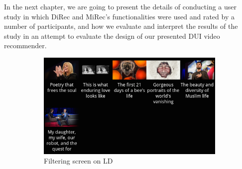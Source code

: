  
In the next chapter, we are going to present the details of conducting a user
study in which DiRec and MiRec's functionalities were used and rated by a number
of participants, and how we evaluate and interpret the results of the study in
an attempt to evaluate the design of our presented DUI video recommender.
\begin{figure}[!htpb]
    \centering
    \begin{subfigure}[b]{0.6\textwidth}
        \includegraphics[width=\textwidth]{figures/filterLD}
        \caption{Filtering screen on LD}
        \label{fig:figure47a}
    \end{subfigure}
    ~ %
    \begin{subfigure}[b]{0.3\textwidth}

\end{subfigure}
\end{figure}
